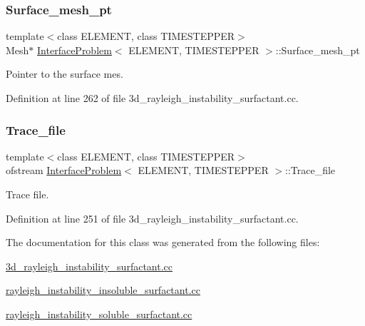 \subsubsection{\texorpdfstring{Surface\+\_\+mesh\+\_\+pt}{Surface\_mesh\_pt}}
{\footnotesize\ttfamily template$<$class E\+L\+E\+M\+E\+NT, class T\+I\+M\+E\+S\+T\+E\+P\+P\+ER$>$ \\
Mesh$\ast$ \hyperlink{classInterfaceProblem}{Interface\+Problem}$<$ E\+L\+E\+M\+E\+NT, T\+I\+M\+E\+S\+T\+E\+P\+P\+ER $>$\+::Surface\+\_\+mesh\+\_\+pt\hspace{0.3cm}{\ttfamily [private]}}



Pointer to the surface mes. 



Definition at line 262 of file 3d\+\_\+rayleigh\+\_\+instability\+\_\+surfactant.\+cc.

\mbox{\label{classInterfaceProblem_a45e3bf3b44bcbeefab21a3598bef6179}} 
\subsubsection{\texorpdfstring{Trace\+\_\+file}{Trace\_file}}
{\footnotesize\ttfamily template$<$class E\+L\+E\+M\+E\+NT, class T\+I\+M\+E\+S\+T\+E\+P\+P\+ER$>$ \\
ofstream \hyperlink{classInterfaceProblem}{Interface\+Problem}$<$ E\+L\+E\+M\+E\+NT, T\+I\+M\+E\+S\+T\+E\+P\+P\+ER $>$\+::Trace\+\_\+file\hspace{0.3cm}{\ttfamily [private]}}



Trace file. 



Definition at line 251 of file 3d\+\_\+rayleigh\+\_\+instability\+\_\+surfactant.\+cc.



The documentation for this class was generated from the following files\+:\begin{DoxyCompactItemize}
\item 
\hyperlink{3d__rayleigh__instability__surfactant_8cc}{3d\+\_\+rayleigh\+\_\+instability\+\_\+surfactant.\+cc}\item 
\hyperlink{rayleigh__instability__insoluble__surfactant_8cc}{rayleigh\+\_\+instability\+\_\+insoluble\+\_\+surfactant.\+cc}\item 
\hyperlink{rayleigh__instability__soluble__surfactant_8cc}{rayleigh\+\_\+instability\+\_\+soluble\+\_\+surfactant.\+cc}\end{DoxyCompactItemize}
